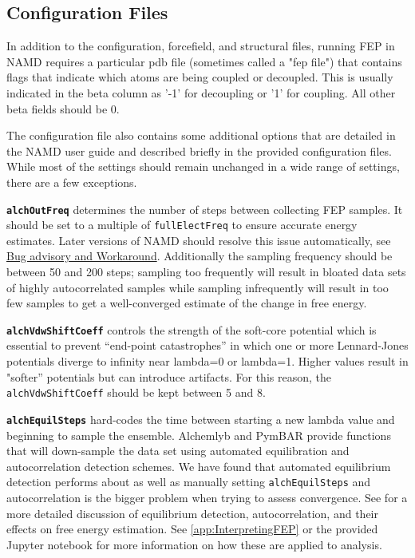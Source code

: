 \documentclass[9pt,tutorial]{Styling/livecoms}
\newcommand{\textInput}[1]{
  \texttt{#1}
}
\begin{document}
\subsection{Configuration Files}
In addition to the configuration, forcefield, and structural files, running FEP in NAMD requires a particular pdb file (sometimes called a "fep file") that contains flags that indicate which atoms are being coupled or decoupled. This is usually indicated in the beta column as '-1' for decoupling or '1' for coupling. All other beta fields should be 0.

The configuration file also contains some additional options that are detailed in the NAMD user guide \cite{Bernardi2020} and described briefly in the provided configuration files. While most of the settings should remain unchanged in a wide range of settings, there are a few exceptions.

\textbf{\textInput{alchOutFreq}} determines the number of steps between collecting FEP samples. It should be set to a multiple of \textInput{fullElectFreq} to ensure accurate energy estimates. Later versions of NAMD should resolve this issue automatically, see \href{https://www.ks.uiuc.edu/Research/namd/mailing_list/namd-l.2020-2021/1487.html}{Bug advisory and Workaround}. Additionally the sampling frequency should be between 50 and 200 steps; sampling too frequently will result in bloated data sets of highly autocorrelated samples while sampling infrequently will result in too few samples to get a well-converged estimate of the change in free energy.

\textbf{\textInput{alchVdwShiftCoeff}} controls the strength of the soft-core potential which is essential to prevent “end-point catastrophes” in which one or more Lennard-Jones potentials diverge to infinity near lambda=0 or lambda=1. Higher values result in "softer'' potentials but can introduce artifacts. For this reason, the \textInput{alchVdwShiftCoeff} should be kept between 5 and 8.

\textbf{\textInput{alchEquilSteps}} hard-codes the time between starting a new lambda value and beginning to sample the ensemble. Alchemlyb and PymBAR provide functions that will down-sample the data set using automated equilibration and autocorrelation detection schemes. We have found that automated equilibrium detection performs about as well as manually setting \textInput{alchEquilSteps} and autocorrelation is the bigger problem when trying to assess convergence. See \cite{shirts2008statistically} for a more detailed discussion of equilibrium detection, autocorrelation, and their effects on free energy estimation. See \ref{app:InterpretingFEP} or the provided Jupyter notebook for more information on how these are applied to analysis.
\end{document}
